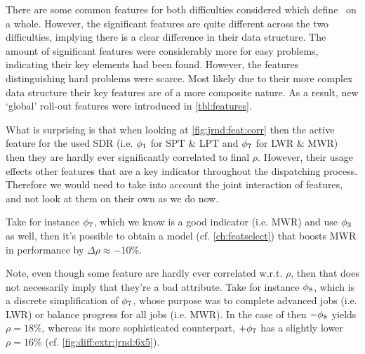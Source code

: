 There are some common features for both difficulties considered which define 
\jsp\ on a whole. However, the significant features are quite different across 
the two difficulties, implying there is a clear difference in their data 
structure. 
The amount of significant features were considerably more for easy 
problems, indicating their key elements had been found. However, the features 
distinguishing hard problems were scarce. Most likely due to their more complex 
data structure their key features are of a more composite nature. As a result, 
new `global' roll-out features were introduced in \cref{tbl:features}. 

What is surprising is that when looking at \cref{fig:jrnd:feat:corr} then the 
active feature for the used SDR (i.e. $\phi_1$ for SPT \& LPT and $\phi_7$
for LWR  \& MWR) then they are hardly ever significantly correlated to final 
$\rho$.
However, their usage effects other features that are a key indicator throughout 
the dispatching process. Therefore we would need to take into account the joint 
interaction of features, and not look at them on their own as we do now. 

Take for instance $\phi_7$, which we know is a good indicator (i.e. MWR) 
and use $\phi_3$ as well, then it's possible to obtain a model (cf. 
\cref{ch:featselect}) that boosts MWR in performance by 
$\Delta\rho\approx-10\%$.

Note, even though some feature are hardly ever correlated w.r.t. $\rho$, then 
that does not necessarily imply that they're a bad attribute.
Take for instance $\phi_8$, which is a discrete simplification of 
$\phi_7$, whose purpose was to complete advanced jobs (i.e. LWR) or 
balance progress for all jobs (i.e. MWR). 
In the case of  then $-\phi_8$ yields $\rho=18\%$, whereas 
its more sophisticated counterpart, $+\phi_7$ has a slightly lower 
$\rho=16\%$ (cf. \cref{fig:diff:extr:jrnd:6x5}).

